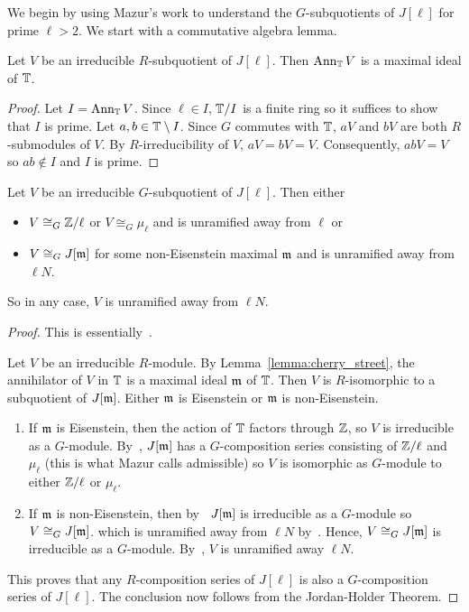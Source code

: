 \documentclass{article}
\begin{document}
We begin by using Mazur's work to understand the $G$-subquotients of $J[\ell]$
for prime $\ell>2$. We start with a commutative algebra lemma.

\begin{lemma}\label{lemma:cherry_street}
    Let $V$ be an irreducible $R$-subquotient of $J[\ell]$. Then $\operatorname{Ann}_{\mathbb{T}} V$
    is a maximal ideal of $\mathbb{T}$.
\end{lemma}
\begin{proof}
    Let $I=\operatorname{Ann}_{\mathbb{T}} V$. Since $\ell\in I$, $\mathbb{T}/I$ is a finite ring so it
    suffices to show that $I$ is prime. Let $a,b\in \mathbb{T}\setminus I$. Since $G$
    commutes with $\mathbb{T}$, $aV$ and $bV$ are both $R$-submodules of $V$. By
    $R$-irreducibility of $V$, $aV=bV=V$. Consequently, $abV=V$ so $ab\notin I$
    and $I$ is prime.
\end{proof}

\begin{theorem}\label{theorem:irreducible_G_sub}
    Let $V$ be an irreducible $G$-subquotient of $J[\ell]$. Then either
    \begin{itemize}
        \item
            $V\cong_G \mathbb{Z}/\ell$ or $V\cong_G \mu_\ell$ and is unramified away
            from $\ell$ or
        \item 
            $V\cong_G J[\mathfrak{m}]$ for some non-Eisenstein maximal $\mathfrak{m}$ and is
            unramified away from $\ell N$.
    \end{itemize}
    So in any case, $V$ is unramified away from $\ell N$.
\end{theorem}
\begin{proof}
    This is essentially~\cite[\S 14]{mazur:eisenstein}. 

    Let $V$ be an irreducible $R$-module. By Lemma~\ref{lemma:cherry_street},
    the annihilator of $V$ in $\mathbb{T}$ is a maximal ideal $\mathfrak{m}$ of $\mathbb{T}$. Then $V$
    is $R$-isomorphic to a subquotient of $J[\mathfrak{m}]$. Either $\mathfrak{m}$ is Eisenstein or
    $\mathfrak{m}$ is non-Eisenstein.
    \begin{enumerate}
        \item
            If $\mathfrak{m}$ is Eisenstein, then the action of $\mathbb{T}$ factors through
            $\mathbb{Z}$, so $V$ is irreducible as a $G$-module. By~\cite[Proposition
            14.1]{mazur:eisenstein}, $J[\mathfrak{m}]$ has a $G$-composition series
            consisting of $\mathbb{Z}/\ell$ and $\mu_\ell$ (this is what Mazur calls
            admissible) so $V$ is isomorphic as $G$-module to either $\mathbb{Z}/\ell$
            or $\mu_\ell$.
        \item
            If $\mathfrak{m}$ is non-Eisenstein, then by~\cite[Proposition
            14.2]{mazur:eisenstein} $J[\mathfrak{m}]$ is irreducible as a $G$-module so
            $V\cong_G J[\mathfrak{m}]$. which is unramified away from $\ell N$
            by~\cite[Theorem 6.7]{deligne-serre}. Hence, $V\cong_G J[\mathfrak{m}]$ is
            irreducible as a $G$-module. By~\cite[Theorem 6.7]{deligne-serre},
            $V$ is unramified away $\ell N$.
    \end{enumerate}
    This proves that any $R$-composition series of $J[\ell]$ is also a
    $G$-composition series of $J[\ell]$. The conclusion now follows from the
    Jordan-Holder Theorem.
\end{proof} 
\end{document}
